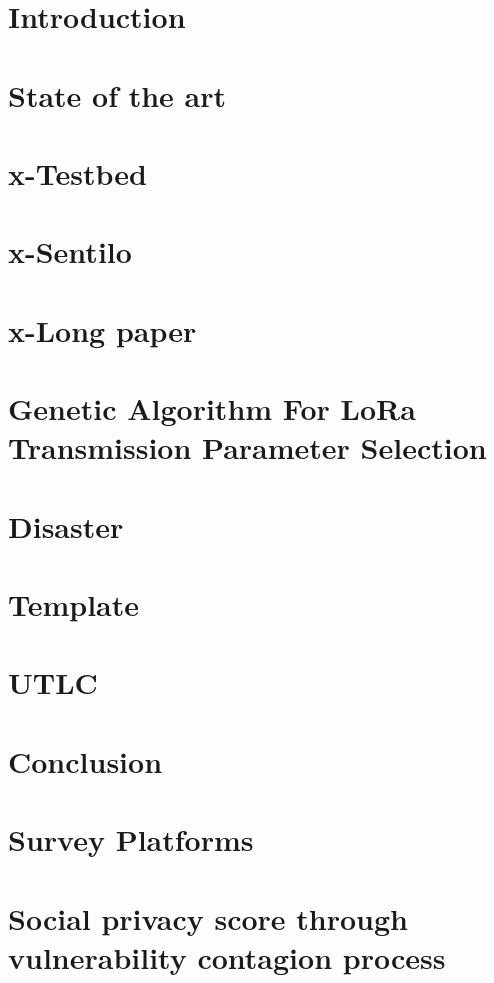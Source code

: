 % 


% 
\def\printbib{\printbibliography}%


\begin{refsection}
\chapter[01]{Introduction}
\chapter[02]{State of the art}
\chapter[03]{x-Testbed}
\chapter[04]{x-Sentilo}
\chapter[05]{x-Long paper}
\chapter[06]{Genetic Algorithm For LoRa Transmission Parameter Selection}
\chapter[21]{Disaster} %
\chapter[07]{Template}
\chapter[08]{UTLC}
\chapter[09]{Conclusion}
\Appendix
\chapter[A]{Survey Platforms}
\chapter[10]{Social privacy score through vulnerability contagion process}
\red{\printbib}
\end{refsection}

